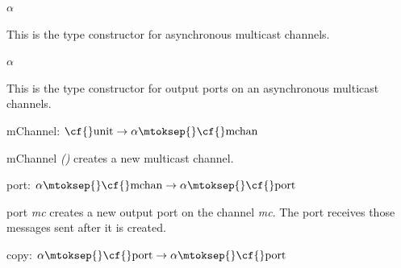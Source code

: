 \begin{descr}
\item {}{} \(\alpha\)~\label{ty-MULTICAST.mchan}

\begin{speccomment}
\item 

          This is the type constructor for asynchronous multicast channels.     \end{speccomment}
\item {}{} \(\alpha\)~\label{ty-MULTICAST.port}

\begin{speccomment}
\item 

          This is the type constructor for output ports on an 	  asynchronous multicast channels.     \end{speccomment}
\item {}{} {\cf mChannel: \(\mbox{\cf{}unit}\rightarrow \alpha\mtoksep{}\mbox{\cf{}mchan}\)}\label{val-MULTICAST.mChannel}


\begin{speccomment}
\item {\cf \small m\-Channel \mbox{\cf \small \textit{()}}           } 
creates a new multicast channel.     \end{speccomment}
\item {}{} {\cf port: \(\alpha\mtoksep{}\mbox{\cf{}mchan}\rightarrow \alpha\mtoksep{}\mbox{\cf{}port}\)}\label{val-MULTICAST.port}


\begin{speccomment}
\item {\cf \small port \mbox{\cf \small \textit{mc}}           } 
creates a new output port on the channel \mbox{\cf \small \textit{mc}}. 	  The port receives those messages sent after it is created.     \end{speccomment}
\item {}{} {\cf copy: \(\alpha\mtoksep{}\mbox{\cf{}port}\rightarrow \alpha\mtoksep{}\mbox{\cf{}port}\)}\label{val-MULTICAST.copy}



\end{descr}
